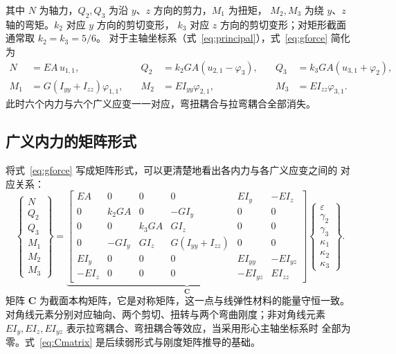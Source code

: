 \documentclass[UTF8,a4paper,11pt]{ctexart}
\newcommand{\bC}{\mathbf{C}}
\begin{document}
其中 $N$ 为轴力，$Q_2,Q_3$ 为沿 $y$、$z$ 方向的剪力，$M_1$ 为扭矩，
$M_2,M_3$ 为绕 $y$、$z$ 轴的弯矩。$k_2$ 对应 $y$ 方向的剪切变形，
$k_3$ 对应 $z$ 方向的剪切变形；对矩形截面通常取 $k_2=k_3=5/6$。
对于主轴坐标系（式~\eqref{eq:principal}），式~\eqref{eq:gforce} 简化为
\begin{equation}
\begin{aligned}
N&=EA\,u_{1,1}, &\quad
Q_2&=k_2GA\left(u_{2,1}-\varphi_3\right), &\quad
Q_3&=k_3GA\left(u_{3,1}+\varphi_2\right),\\
M_1&=G\left(I_{yy}+I_{zz}\right)\varphi_{1,1}, &\quad
M_2&=EI_{yy}\varphi_{2,1}, &\quad
M_3&=EI_{zz}\varphi_{3,1}.
\end{aligned}
\end{equation}
此时六个内力与六个广义应变一一对应，弯扭耦合与拉弯耦合全部消失。

\subsection{广义内力的矩阵形式}

将式~\eqref{eq:gforce} 写成矩阵形式，可以更清楚地看出各内力与各广义应变之间的
对应关系：
\begin{equation}\label{eq:Cmatrix}
\begin{Bmatrix}N\\Q_2\\Q_3\\M_1\\M_2\\M_3\end{Bmatrix}
=
\underbrace{
\begin{bmatrix}
EA & 0 & 0 & 0 & EI_y & -EI_z\\
0 & k_2GA & 0 & -GI_y & 0 & 0\\
0 & 0 & k_3GA & GI_z & 0 & 0\\
0 & -GI_y & GI_z & G(I_{yy}+I_{zz}) & 0 & 0\\
EI_y & 0 & 0 & 0 & EI_{yy} & -EI_{yz}\\
-EI_z & 0 & 0 & 0 & -EI_{yz} & EI_{zz}
\end{bmatrix}}_{\bC}
\begin{Bmatrix}\varepsilon\\\gamma_2\\\gamma_3\\\kappa_1\\\kappa_2\\\kappa_3\end{Bmatrix}.
\end{equation}
矩阵 $\bC$ 为截面本构矩阵，它是对称矩阵，这一点与线弹性材料的能量守恒一致。
对角线元素分别对应轴向、两个剪切、扭转与两个弯曲刚度；非对角线元素
$EI_y,EI_z,EI_{yz}$ 表示拉弯耦合、弯扭耦合等效应，当采用形心主轴坐标系时
全部为零。式~\eqref{eq:Cmatrix} 是后续弱形式与刚度矩阵推导的基础。
\end{document}
